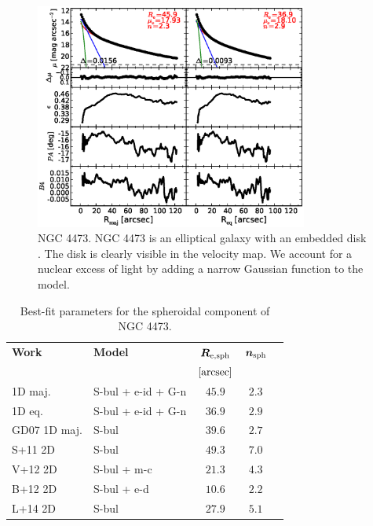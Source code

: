 \documentclass[preprint2]{emulateapj}
\newcommand{\fitfigurewidth}{0.8\textwidth}
\begin{document}
  \begin{figure}[h]
  \begin{center}
  \includegraphics[width=\fitfigurewidth]{images/n4473_1Dfit.eps}
  \caption{NGC 4473.
  NGC 4473 is an elliptical galaxy with an embedded disk \citep{ledo2010}.
  The disk is clearly visible in the velocity map. 
  We account for a nuclear excess of light by adding a narrow Gaussian function to the model.
  }
  \end{center}
  \end{figure}
  
  \begin{table}[h]
  \small
  \caption{Best-fit parameters for the spheroidal component of NGC 4473.}
  \begin{center}
  \begin{tabular}{llccc}
  \hline
  {\bf Work} & {\bf Model}   & $\bm R_{\rm e,sph}$    & $\bm n_{\rm sph}$ \\
    &  &  $[\rm arcsec]$ & \\
  \hline
  1D maj. & S-bul + e-id + G-n & $45.9$  &  $2.3$ \\
  1D eq.  & S-bul + e-id + G-n & $36.9$  &  $2.9$ \\
  \hline
  GD07 1D maj.      & S-bul                 & $39.6$   &  $2.7$ \\
  S+11 2D      & S-bul                 & $49.3$   &  $7.0$ \\
  V+12 2D      & S-bul + m-c           & $21.3$   &  $4.3$ \\
  B+12 2D      & S-bul + e-d           & $10.6$   &  $2.2$ \\
  L+14 2D      & S-bul                 & $27.9$   &  $5.1$ \\
  \hline
  \end{tabular}
  \end{center}
  \label{tab:n4459}
  \end{table}
\end{document}
